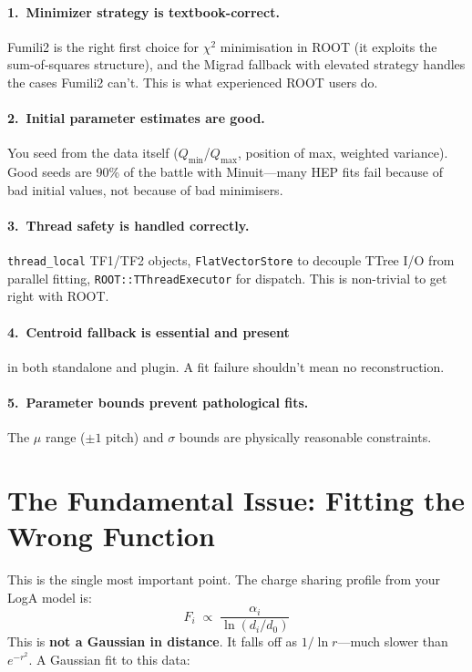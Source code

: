 \documentclass[11pt,a4paper]{article}
\newcommand{\code}[1]{\texttt{#1}}
\begin{document}
\paragraph{1.\ Minimizer strategy is textbook-correct.}
Fumili2 is the right first choice for $\chi^{2}$ minimisation in ROOT
(it exploits the sum-of-squares structure), and the Migrad fallback with
elevated strategy handles the cases Fumili2 can't.  This is what
experienced ROOT users do.

\paragraph{2.\ Initial parameter estimates are good.}
You seed from the data itself ($Q_{\min}$/$Q_{\max}$, position of max,
weighted variance).  Good seeds are 90\% of the battle with Minuit---many
HEP fits fail because of bad initial values, not because of bad
minimisers.

\paragraph{3.\ Thread safety is handled correctly.}
\code{thread\_local} TF1/TF2 objects, \code{FlatVectorStore} to decouple
TTree I/O from parallel fitting, \code{ROOT::TThreadExecutor} for
dispatch.  This is non-trivial to get right with ROOT.

\paragraph{4.\ Centroid fallback is essential and present}
in both standalone and plugin.  A fit failure shouldn't mean no
reconstruction.

\paragraph{5.\ Parameter bounds prevent pathological fits.}
The $\mu$ range ($\pm 1$ pitch) and $\sigma$ bounds are physically
reasonable constraints.

\section{The Fundamental Issue: Fitting the Wrong Function}

This is the single most important point.  The charge sharing profile from
your LogA model is:
\begin{equation}
  F_i \;\propto\; \frac{\alpha_i}{\ln(d_i / d_0)}
  \label{eq:loga}
\end{equation}
This is \textbf{not a Gaussian in distance}.  It falls off as
$1/\ln r$---much slower than $e^{-r^{2}}$.  A Gaussian fit to this data:
\end{document}
